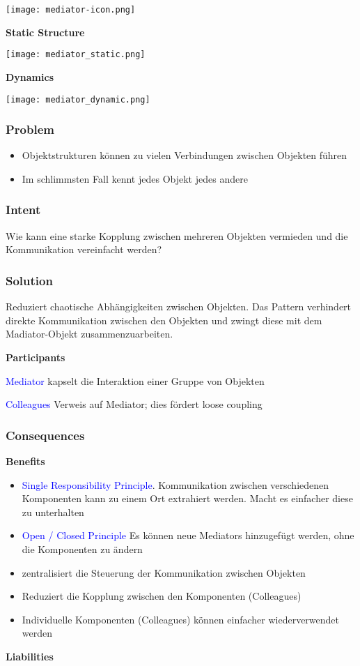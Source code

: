 \texttt{[image: mediator-icon.png]}

\textbf{Static Structure}

\texttt{[image: mediator\_static.png]}

\textbf{Dynamics}

\texttt{[image: mediator\_dynamic.png]}

\subsubsection{Problem}
\begin{itemize}
    \item Objektstrukturen können zu vielen Verbindungen zwischen Objekten führen
    \item Im schlimmsten Fall kennt jedes Objekt jedes andere
\end{itemize}

\subsubsection{Intent}

Wie kann eine starke Kopplung zwischen mehreren Objekten vermieden und die Kommunikation vereinfacht werden?

\subsubsection{Solution}

Reduziert chaotische Abhängigkeiten zwischen Objekten. Das Pattern verhindert direkte Kommunikation zwischen den Objekten und zwingt diese mit dem Madiator-Objekt zusammenzuarbeiten.

\textbf{Participants}

\textcolor{blue}{Mediator} kapselt die Interaktion einer Gruppe von Objekten

\textcolor{blue}{Colleagues} Verweis auf Mediator; dies fördert loose coupling

\subsubsection{Consequences}

\textbf{Benefits}

\begin{itemize}
    \item \textcolor{blue}{Single Responsibility Principle}. Kommunikation zwischen verschiedenen Komponenten kann zu einem Ort extrahiert werden. Macht es einfacher diese zu unterhalten
    \item \textcolor{blue}{Open / Closed Principle} Es können neue Mediators hinzugefügt werden, ohne die Komponenten zu ändern
    \item zentralisiert die Steuerung der Kommunikation zwischen Objekten
    \item Reduziert die Kopplung zwischen den Komponenten (Colleagues)
    \item Individuelle Komponenten (Colleagues) können einfacher wiederverwendet werden
\end{itemize}
\vspace{10pt}
\textbf{Liabilities}

